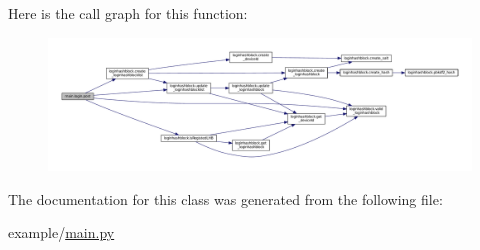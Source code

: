 Here is the call graph for this function\+:
\nopagebreak
\begin{figure}[H]
\begin{center}
\leavevmode
\includegraphics[width=350pt]{classmain_1_1login_a71ff3f89aaf0f0c8502577445ab38744_cgraph}
\end{center}
\end{figure}




The documentation for this class was generated from the following file\+:\begin{DoxyCompactItemize}
\item 
example/\hyperlink{main_8py}{main.\+py}\end{DoxyCompactItemize}
